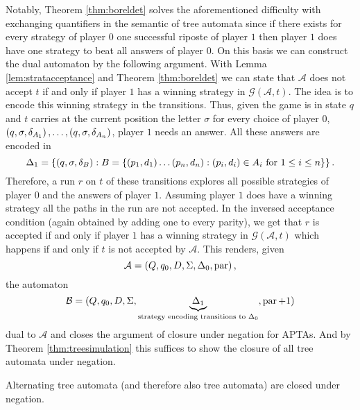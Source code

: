 Notably, Theorem \ref{thm:boreldet}
solves the aforementioned difficulty with exchanging quantifiers in the 
semantic of tree automata since if there exists for every strategy of player 
$0$ one successful riposte of player $1$ then player $1$ does have one strategy
to beat all answers of player $0$. On this basis we can construct the dual 
automaton by the following argument. With Lemma \ref{lem:stratacceptance} and 
Theorem \ref{thm:boreldet} we can state that $\mathcal{A}$ does not 
accept $t$ if and only if player $1$ has a winning strategy in 
$\mathcal{G}(\mathcal{A},t)$. The idea is to encode this winning strategy in
the transitions. Thus, given the game is in state $q$ and $t$ carries at the
current position the letter $\sigma$ for every choice of player $0$,
$\left(q,\sigma,\delta_{A_{1}}\right),\dots,\left(q,\sigma,\delta_{A_{n}}\right)$, player
$1$ needs an answer. All these answers are encoded in 
\begin{equation*}
  \Delta_{1} = \left\{
    \left(q,\sigma, \delta_{B}\right):B = \left\{
      \left(p_{1}, d_{1}\right)\dots\left(p_{n},d_{n}\right):\left(p_{i}, d_{i}\right)\in 
        A_{i} \text{ for }1\leq i\leq n
    \right\}
  \right\}.
\end{equation*}
Therefore, a run $r$ on $t$ of these transitions explores all possible 
strategies of player $0$ and the answers of player $1$. Assuming player $1$ 
does have a winning strategy all the paths in the run are not accepted. In the 
inversed acceptance condition (again obtained by adding one to every parity), 
we get that $r$ is accepted if and only if player $1$ has a winning strategy
in $\mathcal{G}(\mathcal{A}, t)$ which happens if and only if $t$ is not 
accepted by $\mathcal{A}$. This renders, given
\begin{equation*}
  \mathcal{A} = \left(Q, q_{0}, D, \Sigma, \Delta_{0}, \operatorname{par}\right),
\end{equation*}
the automaton
\begin{equation*}
  \mathcal{B} = (Q, q_{0}, D, \Sigma, 
  \underbrace{\Delta_{1}}_{\text{strategy encoding transitions to }\Delta_{0}}, 
  \operatorname{par} + 1)
\end{equation*}
dual to $\mathcal{A}$ and closes the argument of closure under negation for
\acp{APTA}. And by Theorem \ref{thm:treesimulation} this suffices to show the
closure of all tree automata under negation.
\begin{proposition}
  Alternating tree automata (and therefore also tree automata) are closed under
  negation.
  \label{prop:atanegation}
\end{proposition}

